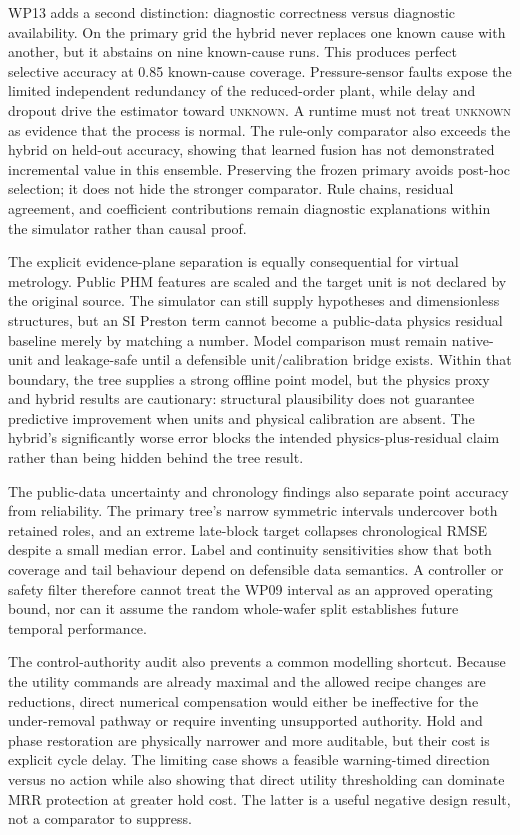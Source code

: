 \documentclass[10pt,twocolumn]{article}
\begin{document}
WP13 adds a second distinction: diagnostic correctness versus diagnostic
availability. On the primary grid the hybrid never replaces one known cause
with another, but it abstains on nine known-cause runs. This produces perfect
selective accuracy at 0.85 known-cause coverage. Pressure-sensor faults expose
the limited independent redundancy of the reduced-order plant, while delay and
dropout drive the estimator toward \textsc{unknown}. A runtime must not treat
\textsc{unknown} as evidence that the process is normal. The rule-only
comparator also exceeds the hybrid on held-out accuracy, showing that learned
fusion has not demonstrated incremental value in this ensemble. Preserving the
frozen primary avoids post-hoc selection; it does not hide the stronger
comparator. Rule chains, residual agreement, and coefficient contributions
remain diagnostic explanations within the simulator rather than causal proof.

The explicit evidence-plane separation is equally consequential for virtual
metrology. Public PHM features are scaled and the target unit is not declared
by the original source. The simulator can still supply hypotheses and
dimensionless structures, but an SI Preston term cannot become a public-data
physics residual baseline merely by matching a number. Model comparison must
remain native-unit and leakage-safe until a defensible unit/calibration bridge
exists. Within that boundary, the tree supplies a strong offline point model,
but the physics proxy and hybrid results are cautionary: structural plausibility
does not guarantee predictive improvement when units and physical calibration
are absent. The hybrid's significantly worse error blocks the intended
physics-plus-residual claim rather than being hidden behind the tree result.

The public-data uncertainty and chronology findings also separate point
accuracy from reliability. The primary tree's narrow symmetric intervals
undercover both retained roles, and an extreme late-block target collapses
chronological RMSE despite a small median error. Label and continuity
sensitivities show that both coverage and tail behaviour depend on defensible
data semantics. A controller or safety filter therefore cannot treat the
WP09 interval as an approved operating bound, nor can it assume the random
whole-wafer split establishes future temporal performance.

The control-authority audit also prevents a common modelling shortcut. Because
the utility commands are already maximal and the allowed recipe changes are
reductions, direct numerical compensation would either be ineffective for the
under-removal pathway or require inventing unsupported authority. Hold and
phase restoration are physically narrower and more auditable, but their cost
is explicit cycle delay. The limiting case shows a feasible warning-timed
direction versus no action while also showing that direct utility thresholding
can dominate MRR protection at greater hold cost. The latter is a useful
negative design result, not a comparator to suppress.
\end{document}
